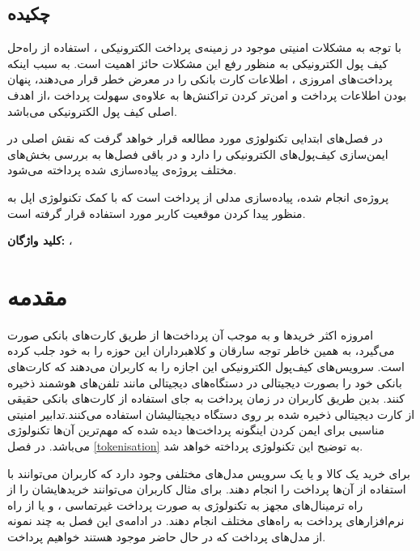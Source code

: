 \documentclass[oneside]{report}
\begin{document}
\newpage


\restoregeometry
\linespread{1.3}
 \section*{چکیده}
\Large \noindent
با توجه به مشکلات امنیتی موجود در زمینه‌ی پرداخت الکترونیکی ، استفاده از راه‌حل‌ کیف پول الکترونیکی به منظور رفع این مشکلات حائز اهمیت است. به سبب اینکه پرداخت‌های امروزی ، اطلاعات کارت بانکی را در معرض خطر قرار می‌دهند، پنهان بودن اطلاعات پرداخت و امن‌تر کردن تراکنش‌ها به علاوه‌ی سهولت پرداخت ،از اهدف اصلی کیف پول ‌الکترونیکی می‌باشد.

\noindent
در فصل‌های ابتدایی تکنولوژی‌
	{\normalsize {}}
مورد مطالعه قرار خواهد گرفت که نقش اصلی در ایمن‌سازی کیف‌پول‌های الکترونیکی را دارد و در باقی فصل‌ها به بررسی بخش‌های مختلف پروژه‌ی پیاده‌سازی شده پرداخته می‌شود.

\noindent
پروژه‌ی انجام شده، پیاده‌سازی مدلی از پرداخت است که با کمک تکنولوژی
{\normalsize {}}
اپل به منظور پیدا کردن موقعیت کاربر مورد استفاده قرار گرفته است.


\vspace*{1cm}
\noindent
\textbf{کلید واژگان: } 
{\large {}} ، {\large {}} 

{\let\cleardoublepage\clearpage 
	\tableofcontents
}
	\chapter{مقدمه}\label{introduction}
		امروزه اکثر خرید‌ها و به موجب آن پرداخت‌ها از طریق کارت‌های بانکی صورت می‌گیرد، به همین خاطر توجه سارقان و کلاهبرداران این حوزه را به خود جلب کرده است. سرویس‌های کیف‌پول الکترونیکی این اجازه را به کاربران می‌دهند که کارت‌های بانکی خود را بصورت دیجیتالی در دستگاه‌های دیجیتالی مانند تلفن‌های هوشمند ذخیره کنند. بدین طریق کاربران در زمان پرداخت به جای استفاده از کارت‌های بانکی حقیقی از کارت دیجیتالی ذخیره شده بر روی دستگاه دیجیتالیشان استفاده می‌کنند.تدابیر امنیتی مناسبی برای ایمن کردن اینگونه پرداخت‌ها دیده شده که  مهم‌ترین آن‌ها تکنولوژی  {\normalsize {}}  می‌باشد. در فصل \ref{tokenisation} به توضیح این تکنولوژی پرداخته خواهد شد.
		
		برای خرید یک کالا و یا یک سرویس مدل‌های مختلفی وجود دارد که کاربران می‌توانند با استفاده از آن‌ها پرداخت را انجام دهند. برای مثال کاربران می‌توانند خریدهایشان را از راه ترمینال‌های مجهز به تکنولوژی 
			{\normalsize {}}
		به صورت پرداخت غیرتماسی
			  ، و یا از راه نرم‌افزار‌های پرداخت به راه‌های مختلف انجام دهند. در ادامه‌ی این فصل به چند نمونه از مدل‌های پرداخت که در حال حاضر موجود هستند خواهیم پرداخت.		
			  
\end{document}
